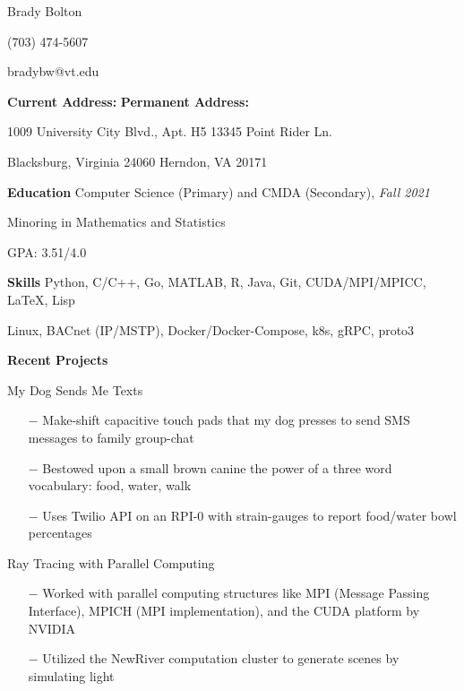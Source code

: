 \documentclass{article}
\begin{document}
	\begin{center}
	
		\huge{Brady Bolton}
		
		\large{(703) 474-5607}
		
		\large{bradybw@vt.edu}
	
	\end{center}

\textbf{Current Address:} \hfill \textbf{Permanent Address:}

1009 University City Blvd., Apt. H5 \hfill 13345 Point Rider Ln.

Blacksburg, Virginia 24060 \hfill Herndon, VA 20171

\vline

\textbf{\large{Education}} \quad Computer Science (Primary) and CMDA (Secondary), \textit{Fall 2021}

\qquad \qquad \qquad \hspace{10pt} Minoring in Mathematics and Statistics

\qquad \qquad \qquad \hspace{10pt} GPA: 3.51/4.0

\vline

\textbf{\large{Skills}} \qquad \qquad Python, C/C++, Go, MATLAB, R, Java, Git, CUDA/MPI/MPICC, \LaTeX, Lisp

\qquad \qquad \qquad \hspace{10pt} Linux, BACnet (IP/MSTP), Docker/Docker-Compose, k8s, gRPC, proto3

\vline

\textbf{\large{Recent Projects}} 

\vspace{5pt}

{\setlength{\leftskip}{15pt}
	{\selectfont My Dog Sends Me Texts}
	\vspace{-5pt}
	\begin{itemize}
		\setlength{\leftskip}{15pt}
		\setlength\itemsep{-0.5em}
		\item[$-$] Make-shift capacitive touch pads that my dog presses to send SMS messages to family group-chat
		\item[$-$] Bestowed upon a small brown canine the power of a three word vocabulary: food, water, walk
		\item[$-$] Uses Twilio API on an RPI-0 with strain-gauges to report food/water bowl percentages
	\end{itemize}

	{\selectfont Ray Tracing with Parallel Computing}
	\vspace{-5pt}
	\begin{itemize}
		\setlength{\leftskip}{15pt}
		\setlength\itemsep{-0.5em}
		\item[$-$] Worked with parallel computing structures like MPI (Message Passing Interface), MPICH (MPI implementation), and the CUDA platform by NVIDIA
		\item[$-$] Utilized the NewRiver computation cluster to generate scenes by simulating light
	\end{itemize}
}
\setlength{\leftskip}{0cm}
\end{document}
